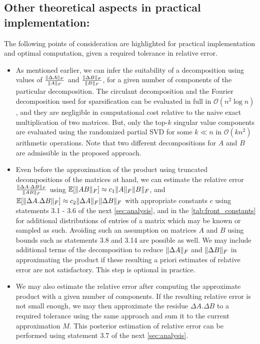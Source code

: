 \documentclass[onefignum,onetabnum]{siamart171218}
\DeclarePairedDelimiter\norm{\lVert}{\rVert}
\begin{document}
\subsection{Other theoretical aspects in practical implementation:} \label{sec:summary_estimation}
The following points of consideration are highlighted for practical implementation and optimal computation, given a required tolerance in relative error.
\begin{itemize}
    \item As mentioned earlier, we can infer the suitability of a decomposition using values of $\frac{\norm{\Delta A}_F} {\norm{A}_F}$ and $\frac{\norm{\Delta B}_F} {\norm{B}_F}$, for a  given number of components of the particular decomposition. The circulant decomposition and the Fourier decomposition used for sparsification can be evaluated in full in $\mathcal{O}(n^2 \log n)$, and they are negligible in computational cost relative to the naive exact multiplication of two matrices. But, only the top-$k$ singular value components are evaluated using the randomized partial SVD for some $k \ll n$ in $\mathcal{O}(kn^2)$ arithmetic operations. Note that two different decompositions for $A$ and $B$ are admissible in the proposed approach.
    \item Even before the approximation of the product using truncated decompositions of the matrices at hand, we can estimate the relative error $\frac{\norm{\Delta A \cdot \Delta B}_F} {\norm{AB}_F}$ using $\mathbb{E}[\norm{AB}_F] \approx c_1 \norm{A}_F \norm{B}_F$, and $\mathbb{E}[\norm{\Delta A.\Delta B}_F] \approx c_2 \norm{\Delta A}_F \norm{\Delta B}_F$ with appropriate constants $c$ using statements 3.1 - 3.6 of the next \cref{sec:analysis}, and in the \cref{tab:front_constants} for additional distributions of entries of a matrix which may be known or sampled as such. Avoiding such an assumption on matrices $A$ and $B$ using bounds such as statements 3.8 and 3.14 are possible as well. We may include additional terms of the decomposition to reduce $\norm{\Delta A}_F$ and $\norm{\Delta B}_F$ in approximating the product if these resulting a priori estimates of relative error are not satisfactory. This step is optional in practice.
    \item We may also estimate the relative error after computing the approximate product with a given number of components. If the resulting relative error is not small enough, we may then approximate the residue $\Delta A. \Delta B$ to a required tolerance using the same approach and sum it to the current approximation $M$. This posterior estimation of relative error can be performed using statement 3.7 of the next \cref{sec:analysis}.

\end{itemize}
\end{document}
